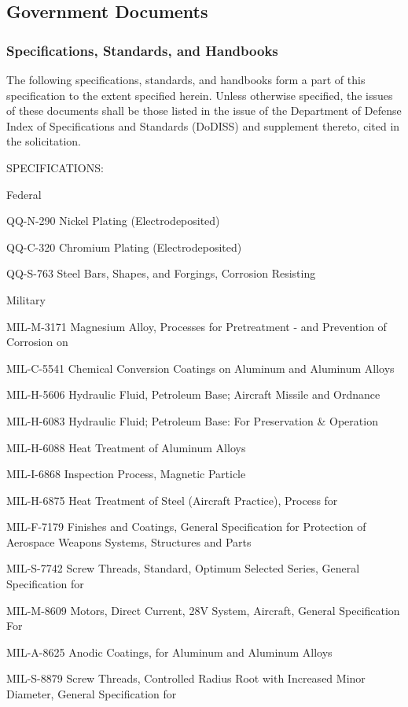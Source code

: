 \documentclass[12pt]{article}
\begin{document}
\subsection{Government Documents}

\subsubsection{Specifications, Standards, and Handbooks}
The following specifications, standards, and handbooks form a part of this specification to the extent specified herein. Unless otherwise specified, the issues of these documents shall be those listed in the issue of the Department of Defense Index of Specifications and Standards (DoDISS) and supplement thereto, cited in the solicitation.

SPECIFICATIONS:

Federal

QQ-N-290 Nickel Plating (Electrodeposited)

QQ-C-320 Chromium Plating (Electrodeposited)

QQ-S-763 Steel Bars, Shapes, and Forgings, Corrosion Resisting

Military

MIL-M-3171 Magnesium Alloy, Processes for Pretreatment - and Prevention of Corrosion on

MIL-C-5541 Chemical Conversion Coatings on Aluminum and Aluminum Alloys

MIL-H-5606 Hydraulic Fluid, Petroleum Base; Aircraft Missile and Ordnance

MIL-H-6083 Hydraulic Fluid; Petroleum Base: For Preservation \& Operation

MIL-H-6088 Heat Treatment of Aluminum Alloys

MIL-I-6868 Inspection Process, Magnetic Particle

MIL-H-6875 Heat Treatment of Steel (Aircraft Practice), Process for

MIL-F-7179 Finishes and Coatings, General Specification for Protection of Aerospace Weapons Systems, Structures and Parts

MIL-S-7742 Screw Threads, Standard, Optimum Selected Series, General Specification for

MIL-M-8609 Motors, Direct Current, 28V System, Aircraft, General Specification For

MIL-A-8625 Anodic Coatings, for Aluminum and Aluminum Alloys

MIL-S-8879 Screw Threads, Controlled Radius Root with Increased Minor Diameter, General Specification for
\end{document}
